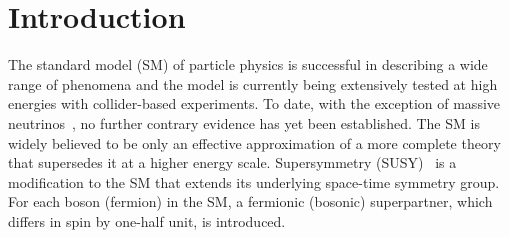 \section{Introduction}
\label{sec:introduction}

The standard model (SM) of particle physics is successful in
describing a wide range of phenomena and the model is currently being
extensively tested at high energies with collider-based experiments.
To date, with the exception of massive neutrinos~\cite{Fukuda:1998mi,
  Ahmad:2001an, Ahmad:2002jz}, no further contrary evidence has yet
been established. The SM is widely believed to be only an effective
approximation of a more complete theory that supersedes it at a higher
energy scale. Supersymmetry (SUSY)~\cite{ref:SUSY-1, ref:SUSY0,
  ref:SUSY3, ref:SUSY1} is a modification to the SM that extends its
underlying space-time symmetry group. For each boson (fermion) in the
SM, a fermionic (bosonic) superpartner, which differs in spin by
one-half unit, is introduced.



